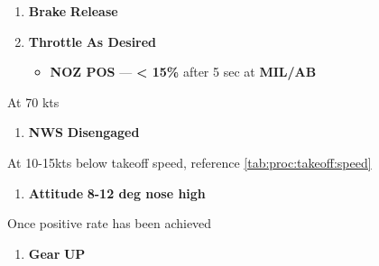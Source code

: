\begin{checklistenumerate}[resume]
    \cbstart
    \begin{enumerate}
        \item \textbf{Brake} \dotfill \textbf{Release}
        \item \textbf{Throttle} \dotfill \textbf{As Desired}\cbend
        \begin{itemize}
            \item \textbf{NOZ POS} --- \textbf{< 15\%} after 5 sec at \textbf{MIL/AB}
        \end{itemize}
    \end{enumerate}
    
    At 70 kts

    \begin{enumerate}[start=3]
        \item \textbf{NWS} \dotfill \textbf{Disengaged}
    \end{enumerate}
    \blueitem[Rotation]\cbstart
    At 10-15kts below takeoff speed, reference \cref{tab:proc:takeoff:speed}

    \begin{enumerate}
        \item \textbf{Attitude} \dotfill \textbf{8-12 deg nose high}
    \end{enumerate}

    Once positive rate has been achieved
    
    \begin{enumerate}[start=2]
        \item \textbf{Gear} \dotfill \textbf{UP}\cbend%
    \end{enumerate}%
\end{checklistenumerate}

